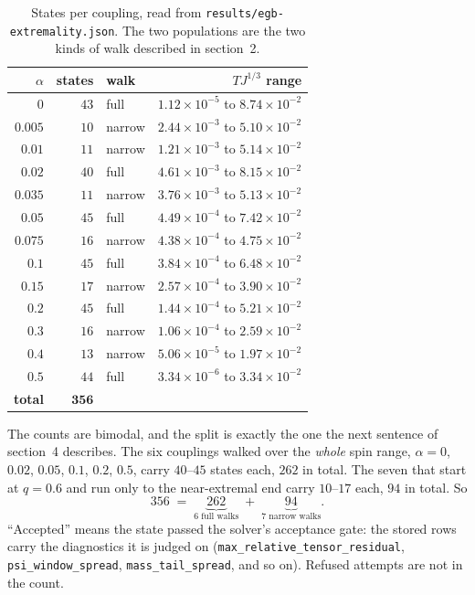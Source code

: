 \documentclass[11pt,a4paper]{article}
\begin{document}
\begin{table}[h]
\centering\small
\begin{tabular}{@{}rrlr@{}}
\toprule
$\alpha$ & states & walk & $TJ^{1/3}$ range \\
\midrule
$0$     & $43$ & full   & $1.12\times10^{-5}$ to $8.74\times10^{-2}$\\
$0.005$ & $10$ & narrow & $2.44\times10^{-3}$ to $5.10\times10^{-2}$\\
$0.01$  & $11$ & narrow & $1.21\times10^{-3}$ to $5.14\times10^{-2}$\\
$0.02$  & $40$ & full   & $4.61\times10^{-3}$ to $8.15\times10^{-2}$\\
$0.035$ & $11$ & narrow & $3.76\times10^{-3}$ to $5.13\times10^{-2}$\\
$0.05$  & $45$ & full   & $4.49\times10^{-4}$ to $7.42\times10^{-2}$\\
$0.075$ & $16$ & narrow & $4.38\times10^{-4}$ to $4.75\times10^{-2}$\\
$0.1$   & $45$ & full   & $3.84\times10^{-4}$ to $6.48\times10^{-2}$\\
$0.15$  & $17$ & narrow & $2.57\times10^{-4}$ to $3.90\times10^{-2}$\\
$0.2$   & $45$ & full   & $1.44\times10^{-4}$ to $5.21\times10^{-2}$\\
$0.3$   & $16$ & narrow & $1.06\times10^{-4}$ to $2.59\times10^{-2}$\\
$0.4$   & $13$ & narrow & $5.06\times10^{-5}$ to $1.97\times10^{-2}$\\
$0.5$   & $44$ & full   & $3.34\times10^{-6}$ to $3.34\times10^{-2}$\\
\midrule
\textbf{total} & $\mathbf{356}$ & & \\
\bottomrule
\end{tabular}
\caption{States per coupling, read from \texttt{results/egb-extremality.json}.
The two populations are the two kinds of walk described in section~2.}
\end{table}

The counts are bimodal, and the split is exactly the one the next sentence of
section~4 describes. The six couplings walked over the \emph{whole} spin range,
$\alpha=0$, $0.02$, $0.05$, $0.1$, $0.2$, $0.5$, carry $40$--$45$ states each,
$262$ in total. The seven that start at $q=0.6$ and run only to the
near-extremal end carry $10$--$17$ each, $94$ in total. So
\[
  356 \;=\; \underbrace{262}_{\text{6 full walks}} \;+\; \underbrace{94}_{\text{7 narrow walks}} .
\]
``Accepted'' means the state passed the solver's acceptance gate: the stored
rows carry the diagnostics it is judged on
(\texttt{max\_relative\_tensor\_residual}, \texttt{psi\_window\_spread},
\texttt{mass\_tail\_spread}, and so on). Refused attempts are not in the count.
\end{document}
